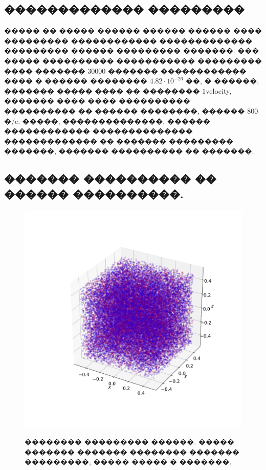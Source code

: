 \subsection{������������� ���������}

\indent ����� �� ����� ������ ������ ������ ���� ��������� ������������ ������������� ��������� ������ ��������� �������. ��� ����� ���������� ����������� ��������� ���� ������� 30000 ������� ������������ ���� � ������ �������� $4.82 \cdot 10^{-26}$ ��, � ������, ������� ����� ���� �� �������� $1$velocity, ������� ���� ���� ���������� ���������� �� ������ ��������, ������ $800$ �/c. �����, ��������������, ������ ������������ �������������� ������������� �� ������� ��������� �������, ������� ���������� �� �������.\\

\subsection{������� ���������� �� ������ ����������.}
\begin{figure}[!h]
{\includegraphics[width=1\linewidth]{particles}}
    \caption{�������� ��������� ������. ����� ������� ������� �������� ������� ���������, ����� ����� � �������.}
\end{figure}
